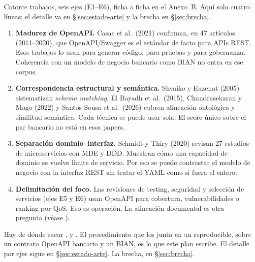 Catorce trabajos, seis ejes (E1--E6), ficha a ficha en el Anexo~B. Aquí solo cuatro líneas; el
detalle va en §\ref{sec:estado-arte} y la brecha en §\ref{sec:brecha}.

\begin{enumerate}
  \item \textbf{Madurez de OpenAPI.} Casas et al.\ (2021) confirman, en 47 artículos (2011--2020),
        que OpenAPI/Swagger es el estándar de facto para APIs REST. Esos trabajos lo usan para
        generar código, para pruebas y para gobernanza. Coherencia con un modelo de negocio
        bancario como BIAN no entra en ese corpus.
  \item \textbf{Correspondencia estructural y semántica.} Shvaiko y Euzenat (2005) sistematizan
        \textit{schema matching}. El Bayadh et al.\ (2015), Chandrasekaran y Mago (2022) y Santos
        Sousa et al.\ (2026) cubren alineación ontológica y similitud semántica. Cada técnica se
        puede usar sola. El score único sobre el par bancario no está en esos papers.
  \item \textbf{Separación dominio--interfaz.} Schmidt y Thiry (2020) revisan 27 estudios de
        microservicios con MDE y DDD. Muestran cómo una capacidad de dominio se vuelve límite de
        servicio. Por eso se puede contrastar el modelo de negocio con la interfaz REST sin tratar
        el YAML como si fuera el \ServiceDomain{} entero.
  \item \textbf{Delimitación del foco.} Las revisiones de testing, seguridad y selección de
        servicios (ejes E5 y E6) usan OpenAPI para cobertura, vulnerabilidades o ranking por QoS.
        Eso es operación. La alineación documental es otra pregunta (véase ).
\end{enumerate}

Hay de dónde sacar \StructuralScore{}, \SemanticScore{} y \CoverageScore{}. El procedimiento que
los junta en un \AlignmentScore{} reproducible, sobre un contrato OpenAPI bancario y un
\ServiceDomain{} BIAN, es lo que este plan escribe. El detalle por ejes sigue en
§\ref{sec:estado-arte}. La brecha, en §\ref{sec:brecha}.
